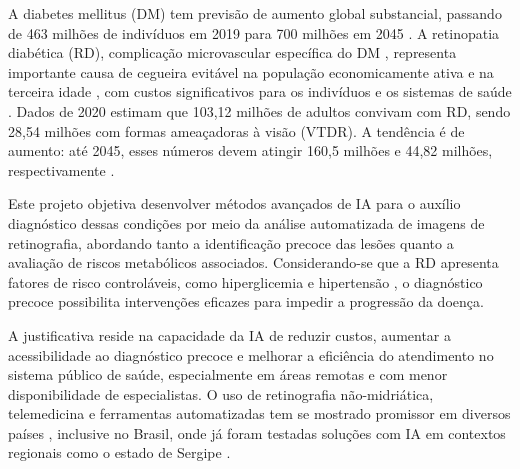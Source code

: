 A diabetes mellitus (DM) tem previsão de aumento global substancial, passando de 463 milhões de indivíduos em 2019 para 700 milhões em 2045 \cite{teo_global_2021}. A retinopatia diabética (RD), complicação microvascular específica do DM \cite{wong_diabetic_2016, wang_diabetic_2018}, representa importante causa de cegueira evitável na população economicamente ativa e na terceira idade \cite{wong_diabetic_2016, wang_diabetic_2018, melo_current_2018, korn_malerbi_feasibility_2022, teo_global_2021}, com custos significativos para os indivíduos e os sistemas de saúde \cite{steinmetz_causes_2021}. Dados de 2020 estimam que 103,12 milhões de adultos convivam com RD, sendo 28,54 milhões com formas ameaçadoras à visão (VTDR). A tendência é de aumento: até 2045, esses números devem atingir 160,5 milhões e 44,82 milhões, respectivamente \cite{teo_global_2021}.

Este projeto objetiva desenvolver métodos avançados de IA para o auxílio diagnóstico dessas condições por meio da análise automatizada de imagens de retinografia, abordando tanto a identificação precoce das lesões quanto a avaliação de riscos metabólicos associados. Considerando-se que a RD apresenta fatores de risco controláveis, como hiperglicemia e hipertensão \cite{wong_diabetic_2016, melo_current_2018}, o diagnóstico precoce possibilita intervenções eficazes para impedir a progressão da doença.

A justificativa reside na capacidade da IA de reduzir custos, aumentar a acessibilidade ao diagnóstico precoce e melhorar a eficiência do atendimento no sistema público de saúde, especialmente em áreas remotas e com menor disponibilidade de especialistas. O uso de retinografia não-midriática, telemedicina e ferramentas automatizadas tem se mostrado promissor em diversos países \cite{wong_diabetic_2016, korn_malerbi_feasibility_2022, topol_high-performance_2019}, inclusive no Brasil, onde já foram testadas soluções com IA em contextos regionais como o estado de Sergipe \cite{korn_malerbi_feasibility_2022}.